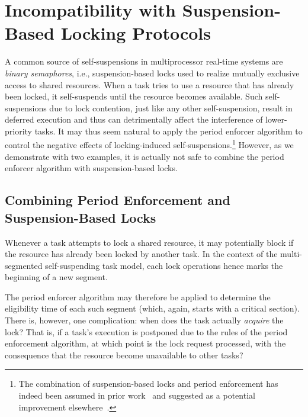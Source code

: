 \section{Incompatibility with Suspension-Based Locking Protocols}
\label{sec:locking}

A common source of self-suspensions in multiprocessor real-time systems are \emph{binary semaphores}, i.e., suspension-based locks used to realize mutually exclusive access to shared resources. When a task tries to use a resource that has already been locked, it self-suspends until the resource becomes available. Such self-suspensions due to lock contention, just like any other self-suspension, result in deferred execution and thus can detrimentally affect the interference of lower-priority tasks. It may thus seem natural to apply the period enforcer algorithm to control the negative effects of locking-induced self-suspensions.\footnote{The combination of suspension-based locks and period enforcement has indeed been assumed in prior work~\cite{Raj:91} and suggested as a potential improvement elsewhere~\cite{Lak:11,LNR:09}.} However, as we demonstrate with two examples, it is actually not safe to combine the period enforcer algorithm with suspension-based locks.

\subsection{Combining Period Enforcement and Suspension-Based Locks}

Whenever a task attempts to lock a shared resource, it may potentially block if the resource has already been  locked by another task. In the context of the multi-segmented self-suspending task model, each lock operations hence marks the beginning of a new segment.

The period enforcer algorithm may therefore be applied to determine the eligibility time of each such segment (which, again, starts with a critical section). There is, however, one complication: when does the task actually \emph{acquire} the lock? That is, if a task's execution is postponed due to the rules of the period enforcement algorithm, at which point is the lock request processed, with the consequence that the resource become unavailable to other tasks? 

